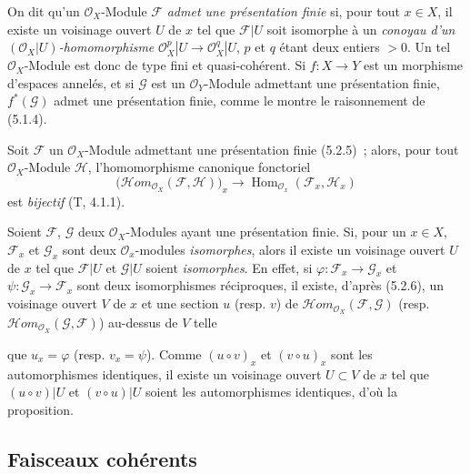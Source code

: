 \begin{env}[5.2.5]
\label{0.5.2.5-fr}
On dit qu'un $\mathcal{O}_X$-Module $\mathcal{F}$ \emph{admet une présentation
finie} si, pour tout $x\in X$, il existe un voisinage ouvert $U$ de $x$ tel
que $\mathcal{F}|U$ soit isomorphe à un \emph{conoyau d'un
$(\mathcal{O}_X|U)$-homomorphisme}
$\mathcal{O}_X^p|U\to\mathcal{O}_X^q|U$, $p$ et $q$ étant deux entiers $>0$.
Un tel $\mathcal{O}_X$-Module est donc de type fini et quasi-cohérent. Si
$f:X\to Y$ est un morphisme d'espaces annelés, et si $\mathcal{G}$ est un
$\mathcal{O}_Y$-Module admettant une présentation finie,
$f^*(\mathcal{G})$ admet une présentation finie, comme le montre le
raisonnement de (5.1.4).
\end{env}

\begin{env}[5.2.6]
\label{0.5.2.6-fr}
Soit $\mathcal{F}$ un $\mathcal{O}_X$-Module admettant une présentation finie
(5.2.5)~; alors, pour tout $\mathcal{O}_X$-Module $\mathcal{H}$,
l'homomorphisme canonique fonctoriel
\[
  \bigl(\mathcal{H}\!om_{\mathcal{O}_X}(\mathcal{F},\mathcal{H})\bigr)_x
  \longrightarrow
  \operatorname{Hom}_{\mathcal{O}_x}(\mathcal{F}_x,\mathcal{H}_x)
\]
est \emph{bijectif} (T, 4.1.1).
\end{env}

\begin{env}[5.2.7]
\label{0.5.2.7-fr}
Soient $\mathcal{F}$, $\mathcal{G}$ deux $\mathcal{O}_X$-Modules ayant une
présentation finie. Si, pour un $x\in X$, $\mathcal{F}_x$ et $\mathcal{G}_x$
sont deux $\mathcal{O}_x$-modules \emph{isomorphes}, alors il existe un
voisinage ouvert $U$ de $x$ tel que $\mathcal{F}|U$ et $\mathcal{G}|U$ soient
\emph{isomorphes}. En effet, si
$\varphi:\mathcal{F}_x\to\mathcal{G}_x$ et
$\psi:\mathcal{G}_x\to\mathcal{F}_x$ sont deux isomorphismes réciproques, il
existe, d'après (5.2.6), un voisinage ouvert $V$ de $x$ et une section $u$
(resp. $v$) de
$\mathcal{H}\!om_{\mathcal{O}_X}(\mathcal{F},\mathcal{G})$ (resp.
$\mathcal{H}\!om_{\mathcal{O}_X}(\mathcal{G},\mathcal{F})$) au-dessus de $V$
telle


que $u_x=\varphi$ (resp. $v_x=\psi$). Comme $(u\circ v)_x$ et
$(v\circ u)_x$ sont les automorphismes identiques, il existe un voisinage
ouvert $U\subset V$ de $x$ tel que $(u\circ v)|U$ et $(v\circ u)|U$ soient les
automorphismes identiques, d'où la proposition.
\end{env}

\subsection{Faisceaux cohérents}
\label{subsection:0.5.3-fr}

